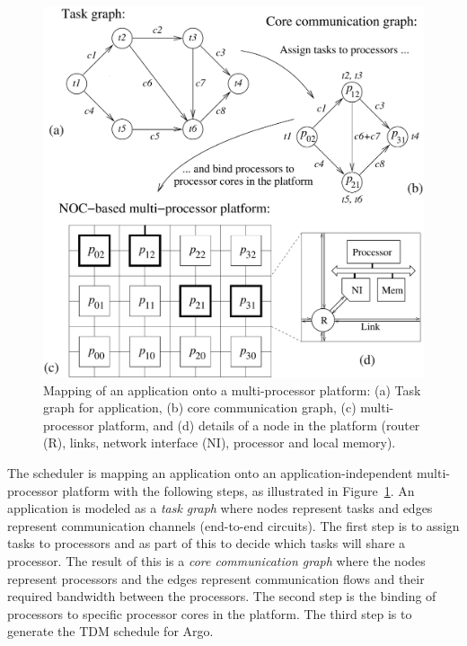 \documentclass[a4paper,fontsize=10pt,twoside,DIV15,BCOR12mm,headinclude=true,footinclude=false,pagesize,bibtotoc]{scrbook}
\begin{document}
\begin{figure}
\centering
\includegraphics[scale=0.4]{fig/flow.pdf}
\caption{ Mapping of an application onto a multi-processor platform: (a) Task graph for application, (b) core communication graph, 
(c) multi-processor platform, and (d) details of a node in the platform (router (R), links, network interface (NI), processor and local memory).}
\label{fig:flow}
\end{figure}


The scheduler is mapping an application onto an application-independent multi-processor platform with the following steps, as illustrated in Figure~\ref{fig:flow}.
An application is modeled as a {\em  task graph} where nodes represent tasks and edges represent communication channels (end-to-end circuits).
The first step is to assign tasks to processors and as part of this to decide which tasks will share a processor.
The result of this is a {\em core communication graph} where the nodes represent processors and the edges represent communication flows and their required bandwidth between the processors.
The second step is the binding of processors to specific processor cores in the platform. %
The third step is to generate the TDM schedule for Argo.
\end{document}
